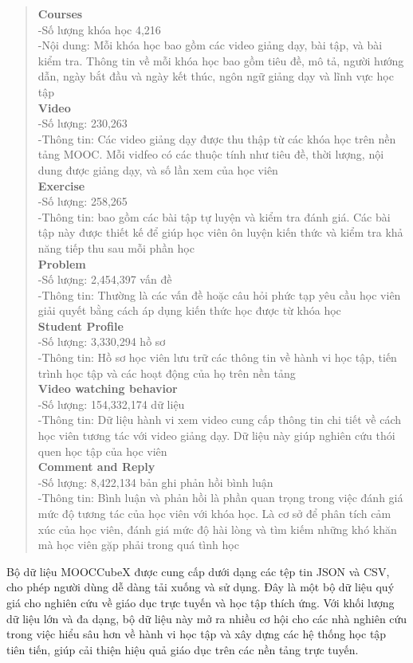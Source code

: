 \begin{quote}
\textbf{Courses}\\
-Số lượng khóa học 4,216\\
-Nội dung: Mỗi khóa học bao gồm các video giảng dạy, bài tập, và bài kiểm tra. Thông tin về mỗi khóa học bao gồm tiêu đề, mô tả, người hướng dẫn, ngày bắt đầu và ngày kết thúc, ngôn ngữ giảng dạy và lĩnh vực học tập\\
\textbf{Video}\\
-Số lượng: 230,263\\
-Thông tin: Các video giảng dạy được thu thập từ các khóa học trên nền tảng MOOC. Mỗi vidfeo có các thuộc tính như tiêu đề, thời lượng, nội dung được giảng dạy, và số lần xem của học viên\\
\textbf{Exercise}\\
-Số lượng: 258,265\\
-Thông tin: bao gồm các bài tập tự luyện và kiểm tra đánh giá. Các bài tập này được thiết kế để giúp học viên ôn luyện kiến thức và kiểm tra khả năng tiếp thu sau mỗi phần học\\
\textbf{Problem}\\
-Số lượng: 2,454,397 vấn đề\\
-Thông tin: Thường là các vấn đề hoặc câu hỏi phức tạp yêu cầu học viên giải quyết bằng cách áp dụng kiến thức học được từ khóa học\\
\textbf{Student Profile}\\
-Số lượng: 3,330,294 hồ sơ\\
-Thông tin: Hồ sơ học viên lưu trữ các thông tin về hành vi học tập, tiến trình học tập và các hoạt động của họ trên nền tảng\\
\textbf{Video watching behavior}\\
-Số lượng: 154,332,174 dữ liệu\\
-Thông tin: Dữ liệu hành vi xem video cung cấp thông tin chi tiết về cách học viên tương tác với video giảng dạy. Dữ liệu này giúp nghiên cứu thói quen học tập của học viên\\
\textbf{Comment and Reply}\\
-Số lượng: 8,422,134 bản ghi phản hồi bình luận\\
-Thông tin: Bình luận và phản hồi là phần quan trọng trong việc đánh giá mức độ tương tác của học viên với khóa học. Là cơ sở để phân tích cảm xúc của học viên, đánh giá mức độ hài lòng và tìm kiếm những khó khăn mà học viên gặp phải trong quá tình học\\
\end{quote}
Bộ dữ liệu MOOCCubeX được cung cấp dưới dạng các tệp tin JSON và CSV, cho phép người dùng dễ dàng tải xuống và sử dụng. Đây là một bộ dữ liệu quý giá cho nghiên cứu về giáo dục trực tuyến và học tập thích ứng. Với khối lượng dữ liệu lớn và đa dạng, bộ dữ liệu này mở ra nhiều cơ hội cho các nhà nghiên cứu trong việc hiểu sâu hơn về hành vi học tập và xây dựng các hệ thống học tập tiên tiến, giúp cải thiện hiệu quả giáo dục trên các nền tảng trực tuyến.\\
